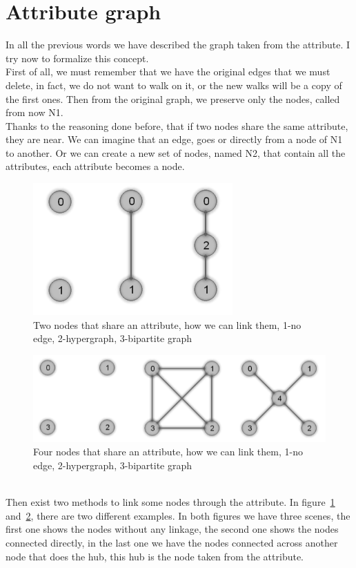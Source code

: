 \section{Attribute graph}
In all the previous words we have described the graph taken from the attribute. I try now to formalize this concept.\\
First of all, we must remember that we have the original edges that we must delete, in fact, we do not want to walk on it, or the new walks will be a copy of the first ones. Then from the original graph, we preserve only the nodes, called from now N1.\\
Thanks to the reasoning done before, that if two nodes share the same attribute, they are near. We can imagine that an edge, goes or directly from a node of N1 to another. Or we can create a new set of nodes, named N2, that contain all the attributes, each attribute becomes a node.
%
\begin{figure}[htp]
	\centering
	\includegraphics{images/add_att2}
	\caption{Two nodes that share an attribute, how we can link them, 1-no edge, 2-hypergraph, 3-bipartite graph}
	\label{fig:add_att2}
\end{figure}
\begin{figure}[htp]
	\centering
	\includegraphics[width=\linewidth]{images/add_att4}
	\caption{Four nodes that share an attribute, how we can link them, 1-no edge, 2-hypergraph, 3-bipartite graph}
	\label{fig:add_att4}
\end{figure}
\\
Then exist two methods to link some nodes through the attribute. In figure~\ref{fig:add_att2} and~\ref{fig:add_att4}, there are two different examples. In both figures we have three scenes, the first one shows the nodes without any linkage, the second one shows the nodes connected directly, in the last one we have the nodes connected across another node that does the hub, this hub is the node taken from the attribute.
